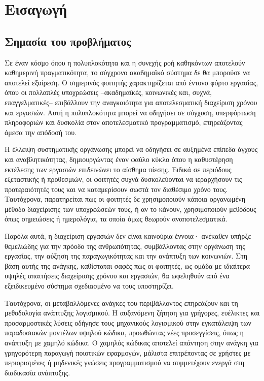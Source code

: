 \chapter{Εισαγωγή}
	\section{Σημασία του προβλήματος}
		Σε έναν κόσμο όπου η πολυπλοκότητα και η συνεχής ροή καθηκόντων αποτελούν καθημερινή πραγματικότητα, το σύγχρονο ακαδημαϊκό σύστημα δε θα μπορούσε να αποτελεί εξαίρεση. Ο σημερινός φοιτητής χαρακτηρίζεται από έντονο φόρτο εργασίας, όπου οι πολλαπλές υποχρεώσεις --ακαδημαϊκές, κοινωνικές και, συχνά, επαγγελματικές-- επιβάλλουν την αναγκαιότητα για αποτελεσματική διαχείριση χρόνου και εργασιών. Αυτή η πολυπλοκότητα μπορεί να οδηγήσει σε σύγχυση, υπερφόρτωση πληροφοριών και δυσκολία στον αποτελεσματικό προγραμματισμό, επηρεάζοντας άμεσα την απόδοσή του.

		Η έλλειψη συστηματικής οργάνωσης μπορεί να οδηγήσει σε αυξημένα επίπεδα άγχους και αναβλητικότητας, δημιουργώντας έναν φαύλο κύκλο όπου η καθυστέρηση εκτέλεσης των εργασιών επιδεινώνει το αίσθημα πίεσης. Ειδικά σε περιόδους εξεταστικής ή προθεσμιών, οι φοιτητές συχνά δυσκολεύονται να ιεραρχήσουν τις προτεραιότητές τους και να καταμερίσουν σωστά τον διαθέσιμο χρόνο τους. Ταυτόχρονα, παρατηρείται πως οι φοιτητές δε χρησιμοποιούν κάποια οργανωμένη μέθοδο διαχείρισης των υποχρεώσεών τους, ή αν το κάνουν, χρησιμοποιούν μεθόδους όπως σημειώσεις ή ημερολόγια, τα οποία όμως θεωρούν αναποτελεσματικά.

		Παρόλα αυτά, η διαχείριση εργασιών δεν είναι καινούρια έννοια· ανέκαθεν υπήρξε θεμελιώδης για την πρόοδο της ανθρωπότητας, συμβάλλοντας στην οργάνωση της εργασίας, την αύξηση της παραγωγικότητας και την ανάπτυξη των κοινωνιών. Στη βάση αυτής της ανάγκης, καθίσταται σαφές πως οι φοιτητές, ως ομάδα με ιδιαίτερα υψηλές απαιτήσεις διαχείρισης χρόνου και εργασιών, θα ωφεληθούν από ένα εξειδικευμένο σύστημα σχεδιασμένο να τους υποστηρίζει.

		Ταυτόχρονα, οι μεταβαλλόμενες ανάγκες του περιβάλλοντος επηρεάζουν και τη μεθοδολογία ανάπτυξης λογισμικού. Η αυξανόμενη ζήτηση για γρήγορες, ευέλικτες και προσαρμοστικές λύσεις οδήγησε τους μηχανικούς λογισμικού στην εγκατάλειψη των παραδοσιακών μοντέλων υψηλού κώδικα, προωθώντας νέες προσεγγίσεις, όπως η ανάπτυξη με χαμηλό κώδικα. Ο χαμηλός κώδικας αποτελεί απάντηση στην ανάγκη για γρηγορότερη παραγωγή ποιοτικών εφαρμογών, μάλιστα επιτρέποντας σε χρήστες με περιορισμένες ή μηδενικές γνώσεις προγραμματισμού να συμμετέχουν ενεργά στη διαδικασία ανάπτυξης.

